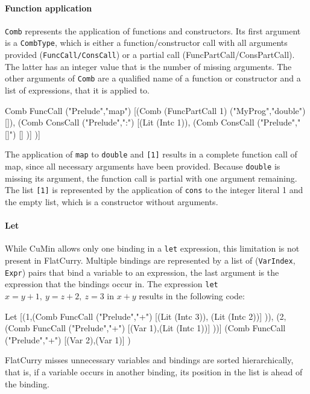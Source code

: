 \documentclass[paper = a4, fleqn, abstract=on, twoside]{scrreprt}
\newcommand{\coqinline}[1]{\texttt{#1}}
\begin{document}
\paragraph{Function application}
\coqinline{Comb} represents the application of functions and constructors. Its first argument is a \coqinline{CombType}, which is either a function/constructor call with all arguments provided (\coqinline{FuncCall/ConsCall}) or a partial call (FuncPartCall/ConsPartCall). The latter has an integer value that is the number of missing arguments. The other arguments of \coqinline{Comb} are a qualified name of a function or constructor and a list of expressions, that it is applied to.
\begin{coqcode}
Comb FuncCall ("Prelude","map") 
     [(Comb (FuncPartCall 1) ("MyProg","double") []),
      (Comb ConsCall ("Prelude",":") [(Lit (Intc 1)),
                                      (Comb ConsCall ("Prelude","[]") [] )] )]
\end{coqcode}
The application of \texttt{map} to \texttt{double} and \texttt{[1]} results in a complete function call of map, since all necessary arguments have been provided. Because \texttt{double} is missing its argument, the function call is partial with one argument remaining. The list \texttt{[1]} is represented by the application of \texttt{cons} to the integer literal 1 and the empty list, which is a constructor without arguments.
\paragraph{Let}
While CuMin allows only one binding in a \texttt{let} expression, this limitation is not present in FlatCurry. Multiple bindings are represented by a list of (\coqinline{VarIndex}, \coqinline{Expr}) pairs that bind a variable to an expression, the last argument is the expression that the bindings occur in. The expression \texttt{let} $x = y + 1,\: y = z + 2,\: z = 3$ in $x + y$ results in the following code:
\begin{coqcode}
Let [(1,(Comb FuncCall ("Prelude","+") [(Lit (Intc 3)), (Lit (Intc 2))] )),
     (2,(Comb FuncCall ("Prelude","+") [(Var 1),(Lit (Intc 1))] ))]
    (Comb FuncCall ("Prelude","+") [(Var 2),(Var 1)] )
\end{coqcode}
FlatCurry misses unnecessary variables and bindings are sorted hierarchically, that is, if a variable occurs in another binding, its position in the list is ahead of the binding.
\end{document}
